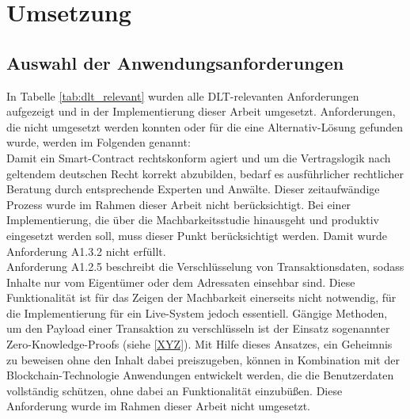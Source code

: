 \chapter{Umsetzung}
\label{ch:implementation}


%
%
\section{Auswahl der Anwendungsanforderungen}
\label{sec:implementation:selection}
In Tabelle \ref{tab:dlt_relevant} wurden alle \ac{DLT}-relevanten Anforderungen aufgezeigt und in der Implementierung dieser Arbeit umgesetzt. Anforderungen, die nicht umgesetzt werden konnten oder für die eine Alternativ-Lösung gefunden wurde, werden im Folgenden genannt:\\
Damit ein Smart-Contract rechtskonform agiert und um die Vertragslogik nach geltendem deutschen Recht korrekt abzubilden, bedarf es ausführlicher rechtlicher Beratung durch entsprechende Experten und Anwälte. Dieser zeitaufwändige Prozess wurde im Rahmen dieser Arbeit nicht berücksichtigt. Bei einer Implementierung, die über die Machbarkeitsstudie hinausgeht und produktiv eingesetzt werden soll, muss dieser Punkt berücksichtigt werden. Damit wurde Anforderung A1.3.2 nicht erfüllt.\\
Anforderung A1.2.5 beschreibt die Verschlüsselung von Transaktionsdaten, sodass Inhalte nur vom Eigentümer oder dem Adressaten einsehbar sind. Diese Funktionalität ist für das Zeigen der Machbarkeit einerseits nicht notwendig, für die Implementierung für ein Live-System jedoch essentiell. Gängige Methoden, um den Payload einer Transaktion zu verschlüsseln ist der Einsatz sogenannter Zero-Knowledge-Proofs (siehe \ref{XYZ}). Mit Hilfe dieses Ansatzes, ein Geheimnis zu beweisen ohne den Inhalt dabei preiszugeben, können in Kombination mit der Blockchain-Technologie Anwendungen entwickelt werden, die die Benutzerdaten vollständig schützen, ohne dabei an Funktionalität einzubüßen. Diese Anforderung wurde im Rahmen dieser Arbeit nicht umgesetzt.\\
